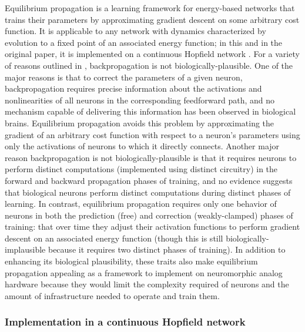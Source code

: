 \documentclass{article}
\begin{document}
Equilibrium propagation \cite{scellier17} is a learning framework for energy-based networks that trains their parameters by approximating gradient descent on some arbitrary cost function. It is applicable to any network with dynamics characterized by evolution to a fixed point of an associated energy function; in this and in the original paper, it is implemented on a continuous Hopfield network \cite{hopfield1984}. For a variety of reasons outlined in \cite{bengio2015}, backpropagation is not biologically-plausible. One of the major reasons is that to correct the parameters of a given neuron, backpropagation requires precise information about the activations and nonlinearities of all neurons in the corresponding feedforward path, and no mechanism capable of delivering this information has been observed in biological brains. Equilibrium propagation avoids this problem by approximating the gradient of an arbitrary cost function with respect to a neuron's parameters using only the activations of neurons to which it directly connects. Another major reason backpropagation is not biologically-plausible is that it requires neurons to perform distinct computations (implemented using distinct circuitry) in the forward and backward propagation phases of training, and no evidence suggests that biological neurons perform distinct computations during distinct phases of learning. In contrast, equilibrium propagation requires only one behavior of neurons in both the prediction (free) and correction (weakly-clamped) phases of training: that over time they adjust their activation functions to perform gradient descent on an associated energy function (though this is still biologically-implausible because it requires two distinct phases of training). In addition to enhancing its biological plausibility, these traits also make equilibrium propagation appealing as a framework to implement on neuromorphic analog hardware because they would limit the complexity required of neurons and the amount of infrastructure needed to operate and train them.

\subsubsection{Implementation in a continuous Hopfield network}
\end{document}
